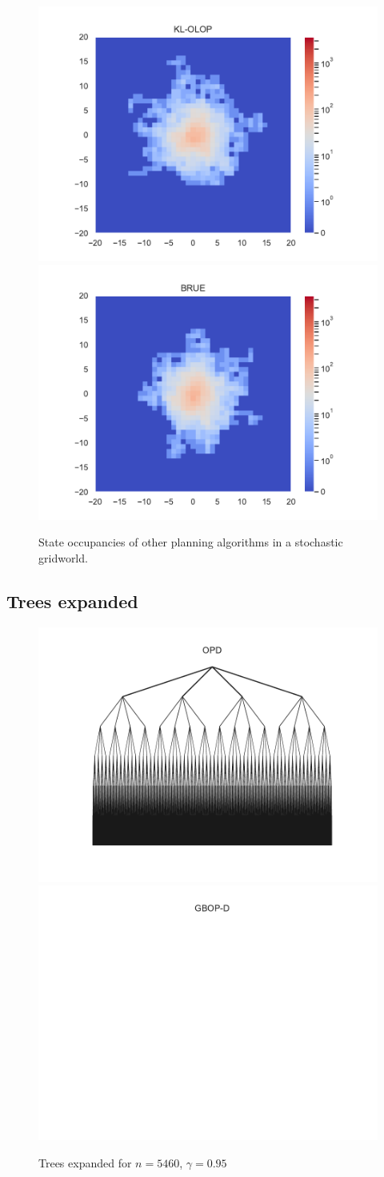 \documentclass[runningheads]{llncs}
\begin{document}
\begin{figure}[H]
	\centering
	\includegraphics[trim={1.8cm 0.7cm 1.8cm 0.7cm}, clip, width=0.49\linewidth]{img/occupations_KL-OLOP.pdf}
	\hfill
	\includegraphics[trim={1.8cm 0.7cm 1.8cm 0.7cm}, clip, width=0.49\linewidth]{img/occupations_BRUE.pdf}
	\caption{State occupancies of other planning algorithms in a stochastic gridworld.}
\end{figure}

\subsection{Trees expanded}
\begin{figure}[H]
	\centering
	\includegraphics[width=0.44\linewidth]{img/tree_OPD.pdf}
	\includegraphics[width=0.44\linewidth]{img/tree_GBOP-D.pdf}
	\caption{Trees expanded for $n = 5460$, $\gamma=0.95$}
	\label{fig:trees_expanded}
\end{figure}
\end{document}
